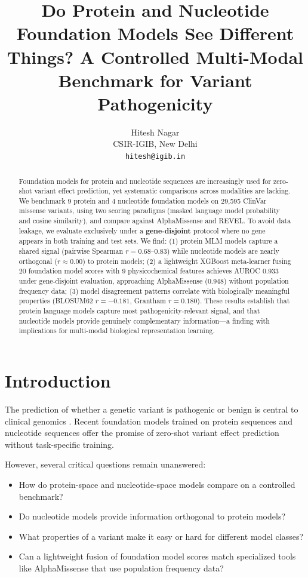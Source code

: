 \documentclass{article}
\title{Do Protein and Nucleotide Foundation Models See Different Things? A Controlled Multi-Modal Benchmark for Variant Pathogenicity}
\author{
  Hitesh Nagar \\
  CSIR-IGIB, New Delhi \\
  \texttt{hitesh@igib.in} \\
}
\begin{document}
\maketitle

\begin{abstract}
Foundation models for protein and nucleotide sequences are increasingly used for zero-shot variant effect prediction, yet systematic comparisons across modalities are lacking. We benchmark 9 protein and 4 nucleotide foundation models on 29,595 ClinVar missense variants, using two scoring paradigms (masked language model probability and cosine similarity), and compare against AlphaMissense and REVEL. To avoid data leakage, we evaluate exclusively under a \textbf{gene-disjoint} protocol where no gene appears in both training and test sets. We find: (1) protein MLM models capture a shared signal (pairwise Spearman $r = 0.68$--$0.83$) while nucleotide models are nearly orthogonal ($r \approx 0.00$) to protein models; (2) a lightweight XGBoost meta-learner fusing 20 foundation model scores with 9 physicochemical features achieves AUROC 0.933 under gene-disjoint evaluation, approaching AlphaMissense (0.948) without population frequency data; (3) model disagreement patterns correlate with biologically meaningful properties (BLOSUM62 $r = -0.181$, Grantham $r = 0.180$). These results establish that protein language models capture most pathogenicity-relevant signal, and that nucleotide models provide genuinely complementary information---a finding with implications for multi-modal biological representation learning.
\end{abstract}

\section{Introduction}

The prediction of whether a genetic variant is pathogenic or benign is central to clinical genomics \cite{rentzsch2019predicting}. Recent foundation models trained on protein sequences \cite{elnaggar2022prottrans, li2023esm1b, lin2023evolutionary} and nucleotide sequences \cite{dalla2024nucleotide, zeng2024dnabert2} offer the promise of zero-shot variant effect prediction without task-specific training.

However, several critical questions remain unanswered:
\begin{itemize}
    \item How do protein-space and nucleotide-space models compare on a controlled benchmark?
    \item Do nucleotide models provide information orthogonal to protein models?
    \item What properties of a variant make it easy or hard for different model classes?
    \item Can a lightweight fusion of foundation model scores match specialized tools like AlphaMissense \cite{cheng2023alphamissense} that use population frequency data?
\end{itemize}
\end{document}
